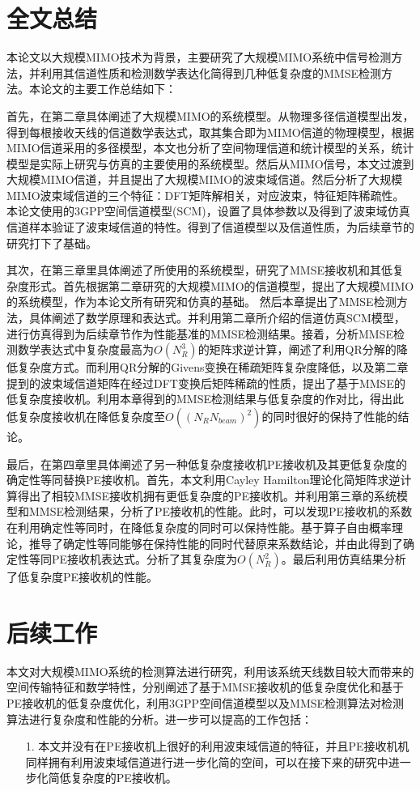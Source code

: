 \documentclass[bachelor,nocolorlinks, printoneside]{seuthesis} %
\begin{document}
\begin{Main}
\section{全文总结}
本论文以大规模MIMO技术为背景，主要研究了大规模MIMO系统中信号检测方法，并利用其信道性质和检测数学表达化简得到几种低复杂度的MMSE检测方法。本论文的主要工作总结如下：

首先，在第二章具体阐述了大规模MIMO的系统模型。从物理多径信道模型出发，得到每根接收天线的信道数学表达式，取其集合即为MIMO信道的物理模型，根据MIMO信道采用的多径模型，本文也分析了空间物理信道和统计模型的关系，统计模型是实际上研究与仿真的主要使用的系统模型。然后从MIMO信号，本文过渡到大规模MIMO信道，并且提出了大规模MIMO的波束域信道。然后分析了大规模MIMO波束域信道的三个特征：DFT矩阵解相关，对应波束，特征矩阵稀疏性。本论文使用的3GPP空间信道模型(SCM)，设置了具体参数以及得到了波束域仿真信道样本验证了波束域信道的特性。得到了信道模型以及信道性质，为后续章节的研究打下了基础。

其次，在第三章里具体阐述了所使用的系统模型，研究了MMSE接收机和其低复杂度形式。首先根据第二章研究的大规模MIMO的信道模型，提出了大规模MIMO的系统模型，作为本论文所有研究和仿真的基础。
然后本章提出了MMSE检测方法，具体阐述了数学原理和表达式。并利用第二章所介绍的信道仿真SCM模型，进行仿真得到为后续章节作为性能基准的MMSE检测结果。接着，分析MMSE检测数学表达式中复杂度最高为$O(N_R^3)$的矩阵求逆计算，阐述了利用QR分解的降低复杂度方式。而利用QR分解的Givens变换在稀疏矩阵复杂度降低，以及第二章提到的波束域信道矩阵在经过DFT变换后矩阵稀疏的性质，提出了基于MMSE的低复杂度接收机。利用本章得到的MMSE检测结果与低复杂度的作对比，得出此低复杂度接收机在降低复杂度至$O((N_RN_{beam})^2)$的同时很好的保持了性能的结论。

最后，在第四章里具体阐述了另一种低复杂度接收机PE接收机及其更低复杂度的确定性等同替换PE接收机。首先，本文利用Cayley Hamilton理论化简矩阵求逆计算得出了相较MMSE接收机拥有更低复杂度的PE接收机。并利用第三章的系统模型和MMSE检测结果，分析了PE接收机的性能。此时，可以发现PE接收机的系数在利用确定性等同时，在降低复杂度的同时可以保持性能。基于算子自由概率理论，推导了确定性等同能够在保持性能的同时代替原来系数结论，并由此得到了确定性等同PE接收机表达式。分析了其复杂度为$O(N_R^2)$。最后利用仿真结果分析了低复杂度PE接收机的性能。

\section{后续工作}
本文对大规模MIMO系统的检测算法进行研究，利用该系统天线数目较大而带来的空间传输特征和数学特性，分别阐述了基于MMSE接收机的低复杂度优化和基于PE接收机的低复杂度优化，利用3GPP空间信道模型以及MMSE检测算法对检测算法进行复杂度和性能的分析。进一步可以提高的工作包括：
\begin{itemize}
\item[1.]本文并没有在PE接收机上很好的利用波束域信道的特征，并且PE接收机机同样拥有利用波束域信道进行进一步化简的空间，可以在接下来的研究中进一步化简低复杂度的PE接收机。


\end{itemize}
\end{Main}
\end{document}
